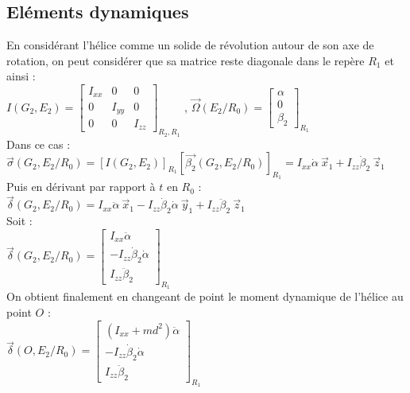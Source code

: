 \documentclass[10pt,a4paper]{article}
\begin{document}
\subsection{Eléments dynamiques}
En considérant l'hélice comme un solide de révolution autour de son axe de rotation, on peut considérer que sa matrice reste diagonale dans le repère $R_{1}$ et ainsi : \\
$
I(G_{2},E_{2}) = 
\begin{bmatrix}
I_{xx} & 0 & 0 \\
0 & I_{yy} & 0 \\
0 & 0 & I_{zz}
\end{bmatrix} _{R_{2},R_{1}}
$
, 
$
\vec{\Omega}(E_{2}/R_{0}) = 
\begin{bmatrix}
\alpha \\
0 \\
\beta_{2}
\end{bmatrix} _{R_{1}}
$ \\

Dans ce cas : \\
$
\vec{\sigma}(G_{2},E_{2}/R_{0}) = 
\left[ I(G_{2},E_{2}) \right] _{R_{1}}
\left[ \vec{\beta_{2}}(G_{2},E_{2}/R_{0}) \right] _{R_{1}}
 = 
 I_{xx} \dot \alpha \ \vec{x}_{1} + I_{zz} \dot \beta_{2} \ \vec{z}_{1}
$ \\

Puis en dérivant par rapport à $t$ en $R_{0}$ : \\
$
\vec{\delta}(G_{2},E_{2}/R_{0}) = 
I_{xx} \ddot \alpha \ \vec{x}_{1}
- I_{zz} \dot \beta_{2} \dot \alpha \ \vec{y}_{1}
+ I_{zz} \ddot \beta_{2} \ \vec{z}_{1}
$ \\

Soit : \\
$
\vec{\delta}(G_{2},E_{2}/R_{0}) =
\begin{bmatrix}
I_{xx} \ddot \alpha \\
- I_{zz} \dot \beta_{2} \dot \alpha \\
I_{zz} \ddot \beta_{2}
\end{bmatrix} _{R_{1}}
$ \\

On obtient finalement en changeant de point le moment dynamique de l'hélice au point $O$ : \\
$
\vec{\delta}(O,E_{2}/R_{0}) =
\begin{bmatrix}
(I_{xx} + m d^2) \ddot \alpha \\
- I_{zz} \dot \beta_{2} \dot \alpha \\
I_{zz} \ddot \beta_{2}
\end{bmatrix} _{R_{1}}
$ \\
\end{document}
